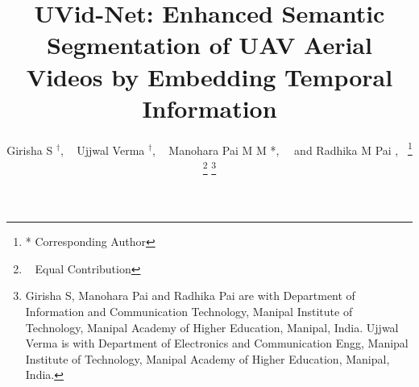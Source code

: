 \documentclass[journal]{IEEEtran}
\begin{document}
\title{UVid-Net: Enhanced Semantic Segmentation of UAV Aerial Videos by Embedding Temporal Information}


\author{Girisha S $^\dag$, ~
         Ujjwal Verma $^\dag$, ~
        Manohara Pai M M *,~
        ~and Radhika M Pai ,~ \thanks{* Corresponding Author}
\thanks{\dag ~ Equal Contribution}
\thanks{Girisha S, Manohara Pai and Radhika Pai are with Department of Information and Communication Technology, Manipal Institute of Technology, Manipal Academy of Higher Education, Manipal, India. Ujjwal Verma is with Department of Electronics and Communication Engg, Manipal Institute of Technology, Manipal Academy of Higher Education, Manipal, India.}}



















\maketitle
\end{document}
